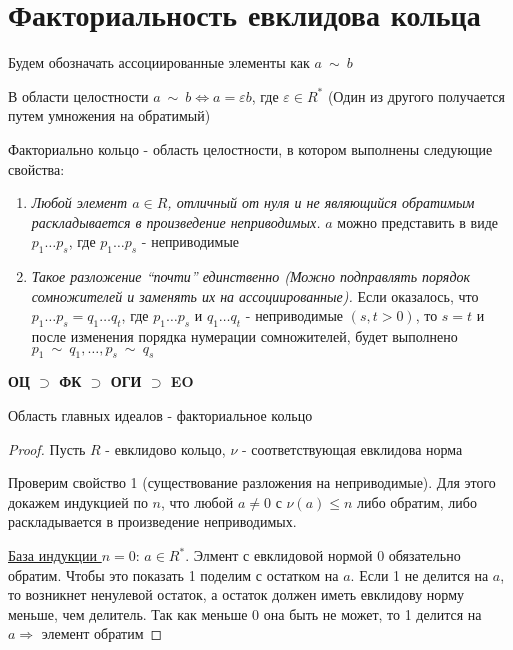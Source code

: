 \section{Факториальность евклидова кольца}
\begin{normalsize}
    Будем обозначать ассоциированные элементы как $a \  \mathtt{\sim} \  b$
    
    В области целостности $a \  \mathtt{\sim} \  b \Longleftrightarrow a = \varepsilon b$, где $\varepsilon \in R^*$ 
    (Один из другого получается путем умножения на обратимый)

    \begin{conj}
        Факториально кольцо - область целостности, в котором выполнены следующие свойства:
        \begin{enumerate}
            \item \textit{Любой элемент $a \in R$, отличный от нуля и не являющийся обратимым раскладывается в
            произведение неприводимых.} $a$ можно представить в виде $p_1 \dots p_s$, где $p_1 \dots p_s$ - неприводимые
            \item \textit{Такое разложение ``почти'' единственно (Можно подправлять порядок сомножителей и заменять их на ассоциированные).
            } Если оказалось, что $p_1 \dots p_s = q_1 \dots q_t$, где $p_1 \dots p_s$ и $q_1 \dots q_t$ 
            - неприводимые $(s, t > 0)$, то $s = t$ и после изменения порядка нумерации сомножителей, будет выполнено $p_1 \  \mathtt{\sim} \  q_1, \dots, p_s \  \mathtt{\sim} \  q_s$
        \end{enumerate}
    \end{conj}
    \textbf{ОЦ $\supset$ ФК $\supset$ ОГИ $\supset$ EO}
    \begin{theorem-non}
        Область главных идеалов - факториальное кольцо
    \end{theorem-non}
    \begin{proof}
        Пусть $R$ - евклидово кольцо, $\nu$ - соответствующая евклидова норма

        Проверим свойство 1 (существование разложения на неприводимые).
        Для этого докажем индукцией по $n$, что любой $a \neq 0$ с $\nu(a) \leqslant n$ либо обратим, 
        либо раскладывается в произведение неприводимых. 

        \underline{База индукции $n = 0$}: $a \in R^*$. Элмент с евклидовой нормой 0 обязательно обратим. Чтобы это показать 
        1 поделим с остатком на $a$. Если 1 не делится на $a$, то возникнет ненулевой остаток, а остаток должен
        иметь евклидову норму меньше, чем делитель. Так как меньше 0 она быть не может, то 1 делится на $a \Longrightarrow$ элемент обратим


\end{proof}
\end{normalsize}
